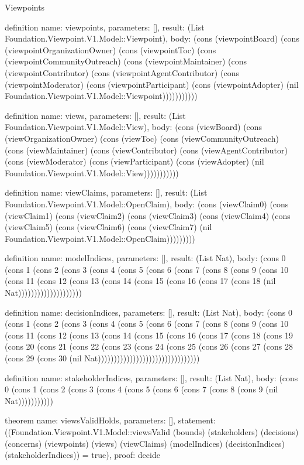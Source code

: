 \begin{lexlean}{Viewpoints}
\begin{semanticmodule}
definition{
  name: viewpoints,
  parameters: [],
  result: (List Foundation.Viewpoint.V1.Model::Viewpoint),
  body: (cons (viewpointBoard) (cons (viewpointOrganizationOwner) (cons (viewpointToc) (cons (viewpointCommunityOutreach) (cons (viewpointMaintainer) (cons (viewpointContributor) (cons (viewpointAgentContributor) (cons (viewpointModerator) (cons (viewpointParticipant) (cons (viewpointAdopter) (nil Foundation.Viewpoint.V1.Model::Viewpoint)))))))))))
}

definition{
  name: views,
  parameters: [],
  result: (List Foundation.Viewpoint.V1.Model::View),
  body: (cons (viewBoard) (cons (viewOrganizationOwner) (cons (viewToc) (cons (viewCommunityOutreach) (cons (viewMaintainer) (cons (viewContributor) (cons (viewAgentContributor) (cons (viewModerator) (cons (viewParticipant) (cons (viewAdopter) (nil Foundation.Viewpoint.V1.Model::View)))))))))))
}

definition{
  name: viewClaims,
  parameters: [],
  result: (List Foundation.Viewpoint.V1.Model::OpenClaim),
  body: (cons (viewClaim0) (cons (viewClaim1) (cons (viewClaim2) (cons (viewClaim3) (cons (viewClaim4) (cons (viewClaim5) (cons (viewClaim6) (cons (viewClaim7) (nil Foundation.Viewpoint.V1.Model::OpenClaim)))))))))
}

definition{
  name: modelIndices,
  parameters: [],
  result: (List Nat),
  body: (cons 0 (cons 1 (cons 2 (cons 3 (cons 4 (cons 5 (cons 6 (cons 7 (cons 8 (cons 9 (cons 10 (cons 11 (cons 12 (cons 13 (cons 14 (cons 15 (cons 16 (cons 17 (cons 18 (nil Nat))))))))))))))))))))
}

definition{
  name: decisionIndices,
  parameters: [],
  result: (List Nat),
  body: (cons 0 (cons 1 (cons 2 (cons 3 (cons 4 (cons 5 (cons 6 (cons 7 (cons 8 (cons 9 (cons 10 (cons 11 (cons 12 (cons 13 (cons 14 (cons 15 (cons 16 (cons 17 (cons 18 (cons 19 (cons 20 (cons 21 (cons 22 (cons 23 (cons 24 (cons 25 (cons 26 (cons 27 (cons 28 (cons 29 (cons 30 (nil Nat))))))))))))))))))))))))))))))))
}

definition{
  name: stakeholderIndices,
  parameters: [],
  result: (List Nat),
  body: (cons 0 (cons 1 (cons 2 (cons 3 (cons 4 (cons 5 (cons 6 (cons 7 (cons 8 (cons 9 (nil Nat)))))))))))
}

theorem{
  name: viewsValidHolds,
  parameters: [],
  statement: ((Foundation.Viewpoint.V1.Model::viewsValid (bounds) (stakeholders) (decisions) (concerns) (viewpoints) (views) (viewClaims) (modelIndices) (decisionIndices) (stakeholderIndices)) = true),
  proof: decide{}
}
\end{semanticmodule}
\end{lexlean}
